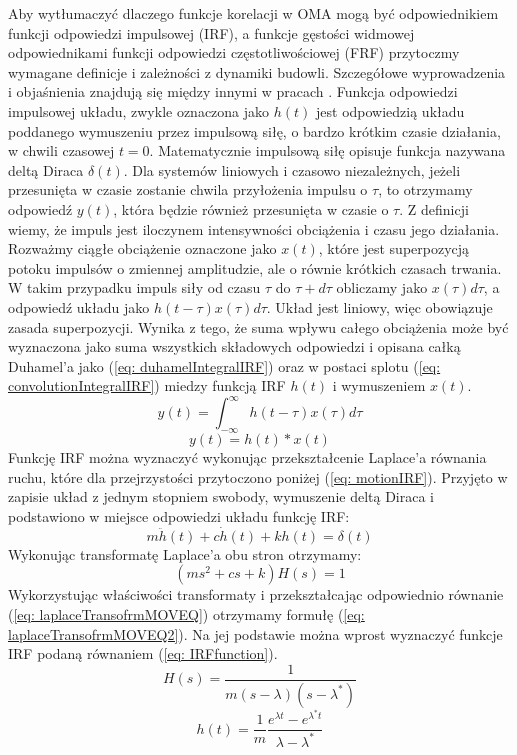 Aby wytłumaczyć dlaczego funkcje korelacji w OMA mogą być odpowiednikiem funkcji odpowiedzi impulsowej (IRF), a funkcje gęstości widmowej odpowiednikami funkcji odpowiedzi częstotliwościowej (FRF) przytoczmy wymagane definicje i zależności z dynamiki budowli. Szczegółowe wyprowadzenia i objaśnienia znajdują się między innymi w pracach \parencite{Brincker2015,Rainieri2014,Chopra2012a,Ewins2000}. Funkcja odpowiedzi impulsowej układu, zwykle oznaczona jako $h(t)$ jest odpowiedzią układu poddanego wymuszeniu przez impulsową siłę, o bardzo krótkim czasie działania, w chwili czasowej $t=0$. Matematycznie impulsową siłę opisuje funkcja nazywana deltą Diraca $\delta(t)$. Dla systemów liniowych i czasowo niezależnych, jeżeli przesunięta w czasie zostanie chwila przyłożenia impulsu o $\tau$, to otrzymamy odpowiedź $y(t)$, która będzie również przesunięta w czasie o $\tau$. Z definicji wiemy, że impuls jest iloczynem intensywności obciążenia i czasu jego działania. Rozważmy ciągłe obciążenie oznaczone jako $x(t)$, które jest superpozycją potoku impulsów o zmiennej amplitudzie, ale o równie krótkich czasach trwania. W takim przypadku impuls siły od czasu $\tau$ do $\tau+d\tau$ obliczamy jako $x(\tau)d\tau$, a odpowiedź układu jako $h(t-\tau)x(\tau)d\tau$. Układ jest liniowy, więc obowiązuje zasada superpozycji. Wynika z tego, że suma wpływu całego obciążenia może być wyznaczona jako suma wszystkich składowych odpowiedzi i opisana całką Duhamel'a jako (\ref{eq: duhamelIntegralIRF}) oraz w postaci splotu (\ref{eq: convolutionIntegralIRF}) miedzy funkcją IRF $h(t)$ i wymuszeniem $x(t)$.
\begin{equation} \label{eq: duhamelIntegralIRF}
	y(t)=\int_{-\infty}^{\infty} h(t-\tau)x(\tau)d\tau
\end{equation}
\begin{equation} \label{eq: convolutionIntegralIRF}
	y(t)=h(t)*x(t)
\end{equation}
Funkcję IRF można wyznaczyć wykonując przekształcenie Laplace'a równania ruchu, które dla przejrzystości przytoczono poniżej (\ref{eq: motionIRF}). Przyjęto w zapisie układ z jednym stopniem swobody, wymuszenie deltą Diraca i podstawiono w miejsce odpowiedzi układu funkcję IRF:
\begin{equation} \label{eq: motionIRF}
	m\ddot{h}(t)+c\dot{h}(t)+kh(t)=\delta(t)
\end{equation}
Wykonując transformatę Laplace'a obu stron otrzymamy:
\begin{equation} \label{eq: laplaceTransofrmMOVEQ}
	(ms^2+cs+k)H(s)=1
\end{equation}
Wykorzystując właściwości transformaty i przekształcając odpowiednio równanie (\ref{eq: laplaceTransofrmMOVEQ}) otrzymamy formułę (\ref{eq: laplaceTransofrmMOVEQ2}). Na jej podstawie można wprost wyznaczyć funkcje IRF podaną równaniem (\ref{eq: IRFfunction}).
\begin{equation} \label{eq: laplaceTransofrmMOVEQ2}
	H(s) = \frac{1}{m(s-\lambda)(s-\lambda^*)}
\end{equation}
\begin{equation} \label{eq: IRFfunction}
	h(t)=\frac{1}{m}\frac{e^{\lambda t}-e^{\lambda^*t}}{\lambda-\lambda^*}
\end{equation}



